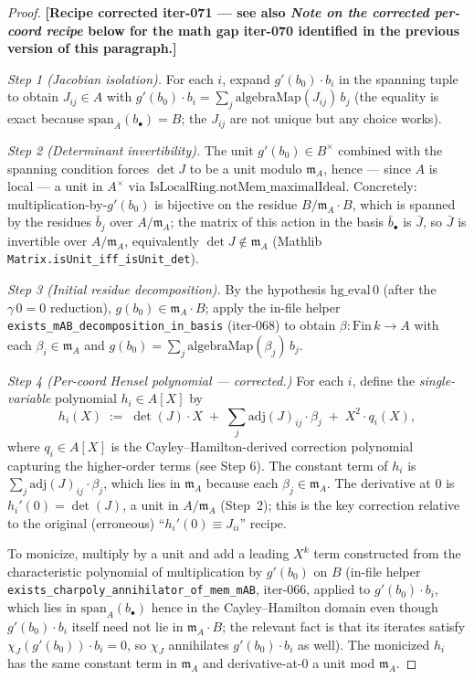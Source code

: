 \begin{proof}

\leanok
\textbf{[Recipe corrected iter-071 — see also \emph{Note on the
corrected per-coord recipe} below for the math gap iter-070
identified in the previous version of this paragraph.]}

\emph{Step 1 (Jacobian isolation).}
For each $i$, expand $g'(b_0) \cdot b_i$ in the spanning tuple
to obtain $J_{ij} \in A$ with
$g'(b_0) \cdot b_i = \sum_j \mathrm{algebraMap}(J_{ij}) \, b_j$
(the equality is exact because $\mathrm{span}_A(b_\bullet) =
B$; the $J_{ij}$ are not unique but any choice works).

\emph{Step 2 (Determinant invertibility).}
The unit $g'(b_0) \in B^\times$ combined with the spanning
condition forces $\det J$ to be a unit modulo $\mathfrak m_A$,
hence — since $A$ is local — a unit in $A^\times$ via
$\mathrm{IsLocalRing.notMem\_maximalIdeal}$. Concretely:
multiplication-by-$g'(b_0)$ is bijective on the residue
$B / \mathfrak m_A \cdot B$, which is spanned by the residues
$\bar b_j$ over $A / \mathfrak m_A$; the matrix of this action
in the basis $\bar b_\bullet$ is $\bar J$, so $\bar J$ is
invertible over $A / \mathfrak m_A$, equivalently $\det J
\not\in \mathfrak m_A$ (Mathlib
\texttt{Matrix.isUnit\_iff\_isUnit\_det}).

\emph{Step 3 (Initial residue decomposition).}
By the hypothesis $\mathrm{hg\_eval}\,0$ (after the
$\gamma\,0 = 0$ reduction), $g(b_0) \in \mathfrak m_A \cdot B$;
apply the in-file helper
\texttt{exists\_mAB\_decomposition\_in\_basis} (iter-068) to
obtain $\beta : \mathrm{Fin}\,k \to A$ with each $\beta_i \in
\mathfrak m_A$ and $g(b_0) = \sum_j \mathrm{algebraMap}(\beta_j)
\, b_j$.

\emph{Step 4 (Per-coord Hensel polynomial — corrected.)}
For each $i$, define the \emph{single-variable} polynomial
$h_i \in A[X]$ by
\[
  h_i(X) \;:=\; \det(J) \cdot X
      \;+\; \sum_j \mathrm{adj}(J)_{ij} \cdot \beta_j
      \;+\; X^2 \cdot q_i(X),
\]
where $q_i \in A[X]$ is the Cayley--Hamilton-derived correction
polynomial capturing the higher-order terms (see Step 6).
The constant term of $h_i$ is $\sum_j \mathrm{adj}(J)_{ij} \cdot
\beta_j$, which lies in $\mathfrak m_A$ because each $\beta_j
\in \mathfrak m_A$. The derivative at $0$ is
$h_i'(0) = \det(J)$, a unit in $A / \mathfrak m_A$ (Step~2);
this is the key correction relative to the original
(erroneous) ``$h_i'(0) \equiv J_{ii}$'' recipe.

To monicize, multiply by a unit and add a leading $X^k$ term
constructed from the characteristic polynomial of multiplication
by $g'(b_0)$ on $B$ (in-file helper
\texttt{exists\_charpoly\_annihilator\_of\_mem\_mAB},
iter-066, applied to $g'(b_0) \cdot b_i$, which lies in
$\mathrm{span}_A (b_\bullet)$ hence in the Cayley--Hamilton
domain even though
$g'(b_0) \cdot b_i$ itself need not lie in $\mathfrak m_A \cdot
B$; the relevant fact is that its iterates satisfy
$\chi_J(g'(b_0)) \cdot b_i = 0$, so $\chi_J$ annihilates
$g'(b_0) \cdot b_i$ as well). The monicized $h_i$ has the same
constant term in $\mathfrak m_A$ and derivative-at-$0$ a unit
mod $\mathfrak m_A$.


\end{proof}
